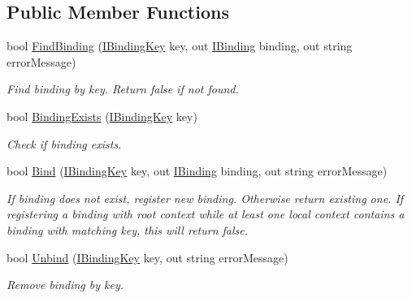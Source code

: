 \subsection*{Public Member Functions}
\begin{DoxyCompactItemize}
\item 
bool \mbox{\hyperlink{interfacecp_games_1_1core_1_1_rapid_m_v_c_1_1_i_binding_collection_a4ca0c71e4a254531712acbbf86e24a00}{Find\+Binding}} (\mbox{\hyperlink{interfacecp_games_1_1core_1_1_rapid_m_v_c_1_1_i_binding_key}{I\+Binding\+Key}} key, out \mbox{\hyperlink{interfacecp_games_1_1core_1_1_rapid_m_v_c_1_1_i_binding}{I\+Binding}} binding, out string error\+Message)
\begin{DoxyCompactList}\small\item\em Find binding by key. Return false if not found. \end{DoxyCompactList}\item 
bool \mbox{\hyperlink{interfacecp_games_1_1core_1_1_rapid_m_v_c_1_1_i_binding_collection_a39534c8594adf07fb09af75f6d0a0de8}{Binding\+Exists}} (\mbox{\hyperlink{interfacecp_games_1_1core_1_1_rapid_m_v_c_1_1_i_binding_key}{I\+Binding\+Key}} key)
\begin{DoxyCompactList}\small\item\em Check if binding exists. \end{DoxyCompactList}\item 
bool \mbox{\hyperlink{interfacecp_games_1_1core_1_1_rapid_m_v_c_1_1_i_binding_collection_afff4c2ad2ff9fb25c906864bc28f036f}{Bind}} (\mbox{\hyperlink{interfacecp_games_1_1core_1_1_rapid_m_v_c_1_1_i_binding_key}{I\+Binding\+Key}} key, out \mbox{\hyperlink{interfacecp_games_1_1core_1_1_rapid_m_v_c_1_1_i_binding}{I\+Binding}} binding, out string error\+Message)
\begin{DoxyCompactList}\small\item\em If binding does not exist, register new binding. Otherwise return existing one. If registering a binding with root context while at least one local context contains a binding with matching key, this will return false. \end{DoxyCompactList}\item 
bool \mbox{\hyperlink{interfacecp_games_1_1core_1_1_rapid_m_v_c_1_1_i_binding_collection_ab20c12c64a91e24e7685780dd64f1d87}{Unbind}} (\mbox{\hyperlink{interfacecp_games_1_1core_1_1_rapid_m_v_c_1_1_i_binding_key}{I\+Binding\+Key}} key, out string error\+Message)
\begin{DoxyCompactList}\small\item\em Remove binding by key. \end{DoxyCompactList}\item 

\end{DoxyCompactItemize}
